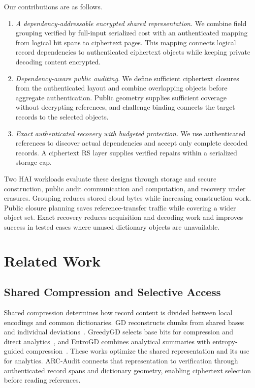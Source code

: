 \documentclass[10pt,journal]{IEEEtran}
\begin{document}
Our contributions are as follows.
\begin{enumerate}
\item \emph{A dependency-addressable encrypted shared representation.}
We combine field grouping verified by full-input serialized cost with an
authenticated mapping from logical bit spans to ciphertext pages. This mapping connects logical record dependencies to authenticated
ciphertext objects while keeping private decoding content encrypted.
\item \emph{Dependency-aware public auditing.}
We define sufficient ciphertext closures from the authenticated layout and
combine overlapping objects before aggregate authentication. Public geometry
supplies sufficient coverage without decrypting references, and challenge
binding connects the target records to the selected objects.
\item \emph{Exact authenticated recovery with budgeted protection.}
We use authenticated references to discover actual dependencies and accept
only complete decoded records. A ciphertext RS layer supplies verified
repairs within a serialized storage cap.
\end{enumerate}

Two HAI workloads evaluate these designs through storage and secure
construction, public audit communication and computation, and recovery under
erasures. Grouping reduces stored cloud bytes while increasing construction
work. Public closure planning saves reference-transfer traffic while covering
a wider object set. Exact recovery reduces acquisition and decoding work and
improves success in tested cases where unused dictionary objects are unavailable.
\section{Related Work}
\subsection{Shared Compression and Selective Access}
Shared compression determines how record content is divided between local
encodings and common dictionaries. GD reconstructs chunks from shared bases and individual
deviations~\cite{Talasila2019}. GreedyGD selects base bits for compression
and direct analytics~\cite{Hurst2024GreedyGD}, and EntroGD combines
analytical summaries with entropy-guided compression~\cite{Zhao2026EntroGD}.
These works optimize the shared representation and its use for analytics.
ARC-Audit connects that representation to verification through authenticated
record spans and dictionary geometry, enabling ciphertext selection before
reading references.
\end{document}
